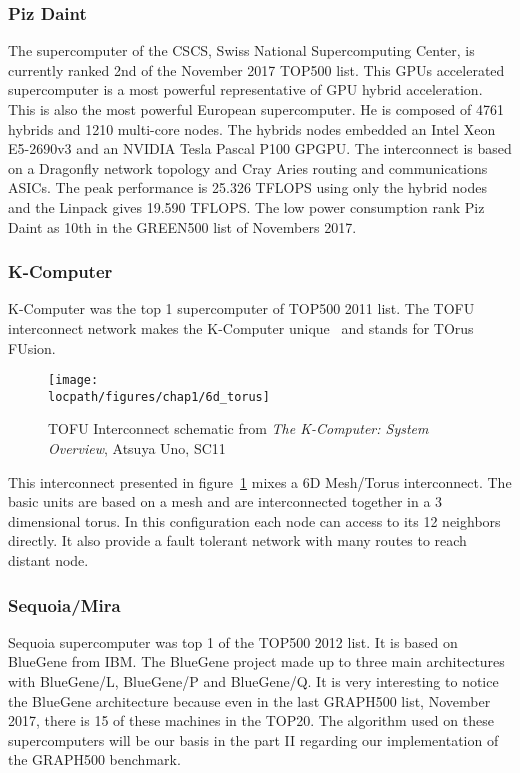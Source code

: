 \subsubsection{Piz Daint}
The supercomputer of the CSCS, Swiss National Supercomputing Center, is currently ranked 2nd of the November 2017 TOP500 list. 
This GPUs accelerated supercomputer is a most powerful representative of GPU hybrid acceleration.
This is also the most powerful European supercomputer. 
He is composed of 4761 hybrids and 1210 multi-core nodes. 
The hybrids nodes embedded an Intel Xeon E5-2690v3 and an NVIDIA Tesla Pascal P100 GPGPU. 
The interconnect is based on a Dragonfly network topology and Cray Aries routing and communications ASICs. 
The peak performance is 25.326 TFLOPS using only the hybrid nodes and the Linpack gives 19.590 TFLOPS.
The low power consumption rank Piz Daint as 10th in the GREEN500 list of Novembers 2017. 

\subsubsection{K-Computer}
K-Computer was the top 1 supercomputer of TOP500 2011 list. 
The TOFU interconnect network makes the K-Computer unique~\cite{ajima2009tofu} and stands for TOrus FUsion.
\begin{figure}[t!]
\begin{center}
\texttt{[image: \\locpath/figures/chap1/6d\_torus]}
\end{center}
\caption{TOFU Interconnect schematic from \textit{The K-Computer: System Overview}, Atsuya Uno, SC11}
\label{fig:1_HPC:tofu}
\end{figure}
This interconnect presented in figure~\ref{fig:1_HPC:tofu} mixes a 6D Mesh/Torus interconnect.
The basic units are based on a mesh and are interconnected together in a 3 dimensional torus. 
In this configuration each node can access to its 12 neighbors directly. 
It also provide a fault tolerant network with many routes to reach distant node. 

\subsubsection{Sequoia/Mira}
Sequoia supercomputer was top 1 of the TOP500 2012 list. 
It is based on BlueGene from IBM.
The BlueGene project made up to three main architectures with BlueGene/L, BlueGene/P and BlueGene/Q.
It is very interesting to notice the BlueGene architecture because even in the last GRAPH500 list, November 2017, there is 15 of these machines in the TOP20.
The algorithm used on these supercomputers will be our basis in the part II regarding our implementation of the GRAPH500 benchmark.

